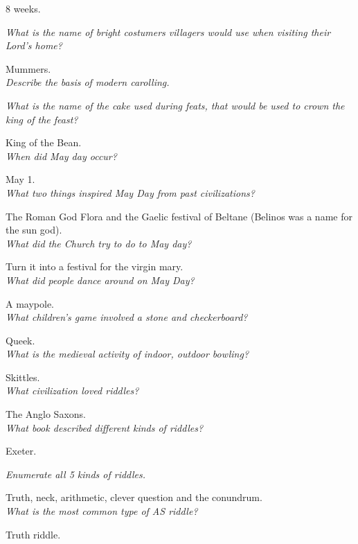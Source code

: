 \documentclass[12pt]{article}
\begin{document}
8 weeks.

\textit{What is the name of bright costumers villagers would use when visiting their Lord's home?}

Mummers.\\

\textit{Describe the basis of modern carolling.}

\textit{What is the name of the cake used during feats, that would be used to crown the king of the feast?}

King of the Bean.\\

\textit{When did May day occur?}

May 1.\\

\textit{What two things inspired May Day from past civilizations?}

The Roman God Flora and the Gaelic festival of Beltane (Belinos was a name for the sun god).\\

\textit{What did the Church try to do to May day?}

Turn it into a festival for the virgin mary.\\

\textit{What did people dance around on May Day?}

A maypole.\\

\textit{What children's game involved a stone and checkerboard?}

Queek.\\

\textit{What is the medieval activity of indoor, outdoor bowling?}

Skittles.\\

\textit{What civilization loved riddles?}

The Anglo Saxons.\\

\textit{What book described different  kinds of riddles?}

Exeter.

\textit{Enumerate all 5 kinds of riddles.}

Truth, neck, arithmetic, clever question and the conundrum.\\

\textit{What is the most common type of AS riddle?}

Truth riddle.\\
\end{document}
